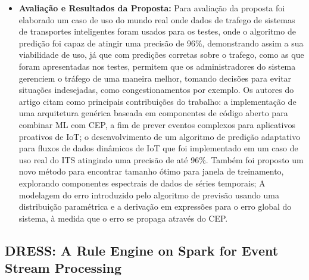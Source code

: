 \documentclass[tid,table]{texufpel} %
\begin{document}
\begin{itemize}
	 \item \textbf{Avaliação e Resultados da Proposta:}
	 Para avaliação da proposta foi elaborado um caso de uso do mundo real onde dados de trafego de sistemas de transportes inteligentes foram usados para os testes, onde o algoritmo de predição foi capaz de atingir uma precisão de 96\%, demonstrando assim a sua viabilidade de uso, já que com predições corretas sobre o trafego, como as que foram apresentadas nos testes, permitem que os administradores do sistema gerenciem o tráfego de uma maneira melhor, tomando decisões para evitar situações indesejadas, como congestionamentos por exemplo.	 
	 Os autores do artigo citam como principais contribuições do trabalho:
	 a implementação de uma arquitetura genérica baseada em componentes de código aberto para combinar ML com CEP, a fim de prever eventos complexos para aplicativos proativos de IoT;
	 o desenvolvimento de um algoritmo de predição adaptativo para fluxos de dados dinâmicos de IoT que foi implementado em um caso de uso real do ITS atingindo uma precisão de até 96\%. Também foi proposto um novo método para encontrar tamanho ótimo para janela de treinamento, explorando componentes espectrais de dados de séries temporais;
	 A modelagem do erro introduzido pelo algoritmo de previsão usando uma distribuição paramétrica e a derivação em expressões para o erro global do sistema, à medida que o erro se propaga através do CEP.
\end{itemize}


\subsection{DRESS: A Rule Engine on Spark for Event Stream Processing}
\end{document}
